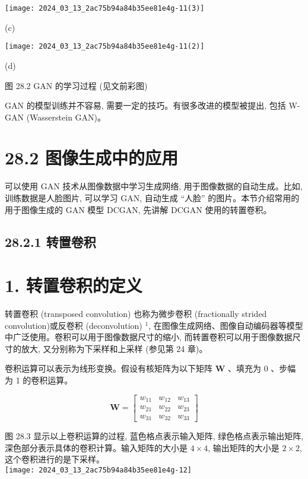 \documentclass[10pt]{article}
\begin{document}
\begin{center}
\texttt{[image: 2024\_03\_13\_2ac75b94a84b35ee81e4g-11(3)]}
\end{center}

(c)

\begin{center}
\texttt{[image: 2024\_03\_13\_2ac75b94a84b35ee81e4g-11(2)]}
\end{center}

(d)

图 28.2 GAN 的学习过程 (见文前彩图)

GAN 的模型训练并不容易, 需要一定的技巧。有很多改进的模型被提出, 包括 W-GAN (Wasserstein GAN)。

\section*{28.2 图像生成中的应用}
可以使用 GAN 技术从图像数据中学习生成网络, 用于图像数据的自动生成。比如, 训练数据是人脸图片, 可以学习 GAN, 自动生成 “人脸” 的图片。本节介绍常用的用于图像生成的 GAN 模型 DCGAN, 先讲解 DCGAN 使用的转置卷积。

\subsection*{28.2.1 转置卷积}
\section*{1. 转置卷积的定义}
转置卷积 (transposed convolution) 也称为微步卷积 (fractionally strided convolution)或反卷积 (deconvolution) ${ }^{1}$, 在图像生成网络、图像自动编码器等模型中广泛使用。卷积可以用于图像数据尺寸的缩小, 而转置卷积可以用于图像数据尺寸的放大, 又分别称为下采样和上采样 (参见第 24 章)。

卷积运算可以表示为线形变换。假设有核矩阵为以下矩阵 $\boldsymbol{W}$ 、填充为 0 、步幅为 1 的卷积运算。

\[
\boldsymbol{W}=\left[\begin{array}{lll}
w_{11} & w_{12} & w_{13}  \tag{28.11}\\
w_{21} & w_{22} & w_{23} \\
w_{31} & w_{32} & w_{33}
\end{array}\right]
\]

图 28.3 显示以上卷积运算的过程, 蓝色格点表示输入矩阵, 绿色格点表示输出矩阵, 深色部分表示具体的卷积计算。输入矩阵的大小是 $4 \times 4$, 输出矩阵的大小是 $2 \times 2$, 这个卷积进行的是下采样。\\
\texttt{[image: 2024\_03\_13\_2ac75b94a84b35ee81e4g-12]}
\end{document}
